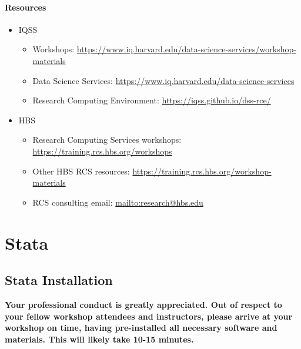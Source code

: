 \documentclass[
]{book}
\providecommand{\tightlist}{%
  \setlength{\itemsep}{0pt}\setlength{\parskip}{0pt}}
\begin{document}
\hypertarget{resources-8}{%
\subsection{Resources}\label{resources-8}}

\begin{itemize}
\tightlist
\item
  IQSS

  \begin{itemize}
  \tightlist
  \item
    Workshops: \url{https://www.iq.harvard.edu/data-science-services/workshop-materials}
  \item
    Data Science Services: \url{https://www.iq.harvard.edu/data-science-services}
  \item
    Research Computing Environment: \url{https://iqss.github.io/dss-rce/}
  \end{itemize}
\item
  HBS

  \begin{itemize}
  \tightlist
  \item
    Research Computing Services workshops: \url{https://training.rcs.hbs.org/workshops}
  \item
    Other HBS RCS resources: \url{https://training.rcs.hbs.org/workshop-materials}
  \item
    RCS consulting email: \url{mailto:research@hbs.edu}
  \end{itemize}
\end{itemize}

\hypertarget{part-stata}{%
\part{Stata}\label{part-stata}}

\hypertarget{stata-installation}{%
\chapter{Stata Installation}\label{stata-installation}}

\begin{alert}

\textbf{Your professional conduct is greatly appreciated. Out of respect to your fellow workshop attendees and instructors, please arrive at your workshop on time, having pre-installed all necessary software and materials. This will likely take 10-15 minutes.}

\end{alert}
\end{document}
